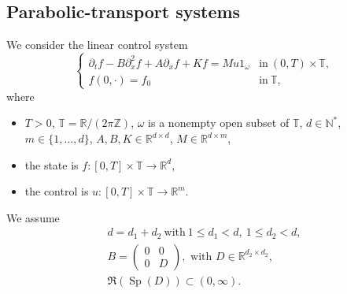 \documentclass[10pt]{amsart}
\theoremstyle{plain}
\theoremstyle{definition}
\theoremstyle{remark}
\DeclareMathOperator{\Sp}{Sp}
\newcommand{\set}{\mathbb}
\newcommand{\N}{\set{N}}
\newcommand{\Z}{\set{Z}}
\newcommand{\R}{} %
\renewcommand{\R}{\set{R}}
\newcommand{\T}{\set{T}}
\begin{document}
\subsection{Parabolic-transport systems}
We consider the linear control system
\begin{equation}
\label{Syst}\tag{Sys}
\begin{cases}
\partial_t f- B \partial_{x}^2 f + A \partial_x f + K f = M u 1_{\omega} &\text{in}\ (0,T)\times \T,\\
f(0,\cdot)=f_0& \text{in}\ \T,
\end{cases}
\end{equation}
where
\begin{itemize}
\item $T >0$, $\T = \R/(2\pi \Z)$, $\omega$ is a nonempty open subset of $\T$, $d \in \N^{*}$, $m\in\{1,\dots,d\}$, $A, B, K \in \R^{d \times d}$, $M\in\R^{d\times m}$,
\item the state is $f\colon [0,T]\times\T \to \R^d$,
\item the control is $u\colon [0,T]\times\T \to \R^m$.
\end{itemize}
We assume
\begin{gather}
d=d_1 + d_2\ \text{with}\ 1 \leq d_1 < d,\ 1 \leq d_2 < d,\label{dd1d2}\tag{H.1}\\
B = \begin{pmatrix}0&0\\0&D\end{pmatrix},\text{ with } D\in \set R^{d_2\times d_2},\label{h:B}\tag{H.2}\\
\Re(\Sp(D)) \subset (0,\infty). \label{h:D}\tag{H.3}
\end{gather}
\end{document}
